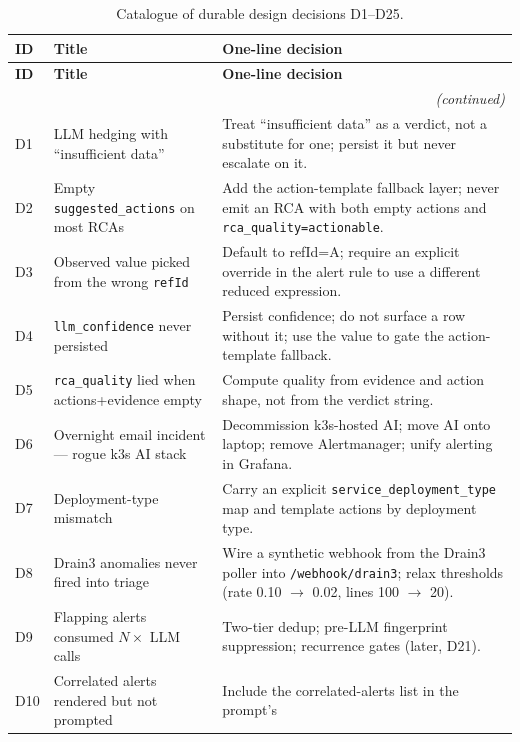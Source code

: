 \documentclass[11pt,a4paper,oneside]{report}
\begin{document}
\begin{longtable}{p{} p{} p{}}
\caption{Catalogue of durable design decisions D1--D25.}
\label{tab:decisions} \\
\toprule
\textbf{ID} & \textbf{Title} & \textbf{One-line decision} \\
\midrule
\endfirsthead
\toprule
\textbf{ID} & \textbf{Title} & \textbf{One-line decision} \\
\midrule
\endhead
\midrule
\multicolumn{3}{r}{\itshape (continued)} \\
\endfoot
\bottomrule
\endlastfoot
D1  & LLM hedging with ``insufficient data''
    & Treat ``insufficient data'' as a verdict, not a substitute for
      one; persist it but never escalate on it. \\
D2  & Empty \texttt{suggested\_actions} on most RCAs
    & Add the action-template fallback layer; never emit an RCA with
      both empty actions and \texttt{rca\_quality=actionable}. \\
D3  & Observed value picked from the wrong \texttt{refId}
    & Default to refId=A; require an explicit override in the alert
      rule to use a different reduced expression. \\
D4  & \texttt{llm\_confidence} never persisted
    & Persist confidence; do not surface a row without it; use the
      value to gate the action-template fallback. \\
D5  & \texttt{rca\_quality} lied when actions+evidence empty
    & Compute quality from evidence and action shape, not from the
      verdict string. \\
D6  & Overnight email incident --- rogue k3s AI stack
    & Decommission k3s-hosted AI; move AI onto laptop;
      remove Alertmanager; unify alerting in Grafana. \\
D7  & Deployment-type mismatch
    & Carry an explicit \texttt{service\_deployment\_type} map and
      template actions by deployment type. \\
D8  & Drain3 anomalies never fired into triage
    & Wire a synthetic webhook from the Drain3 poller into
      \texttt{/webhook/drain3}; relax thresholds (rate 0.10 $\to$
      0.02, lines 100 $\to$ 20). \\
D9  & Flapping alerts consumed $N\times$ LLM calls
    & Two-tier dedup; pre-LLM fingerprint suppression; recurrence
      gates (later, D21). \\
D10 & Correlated alerts rendered but not prompted
    & Include the correlated-alerts list in the prompt's

\end{longtable}
\end{document}
